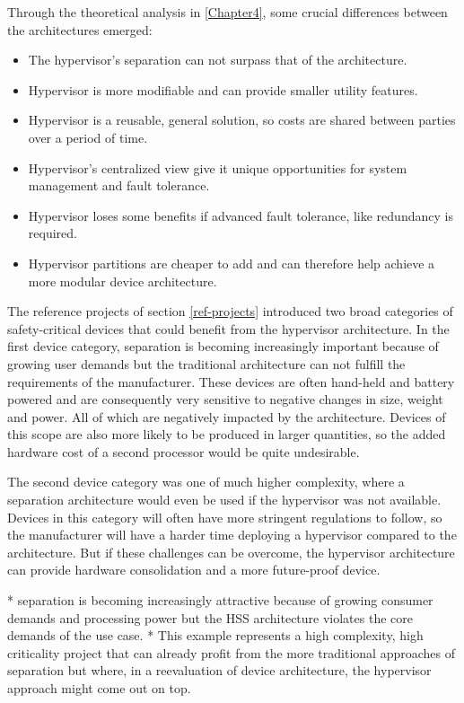 Through the theoretical analysis in \ref{Chapter4}, some crucial differences between the architectures emerged:
\begin{itemize}
    \item The hypervisor's separation can not surpass that of the  architecture.
    \item Hypervisor is more modifiable and can provide smaller utility features.
    \item Hypervisor is a reusable, general solution, so costs are shared between parties over a period of time.
    \item Hypervisor's centralized view give it unique opportunities for system management and fault tolerance.
    \item Hypervisor loses some benefits if advanced fault tolerance, like redundancy is required.
    \item Hypervisor partitions are cheaper to add and can therefore help achieve a more modular device architecture.
\end{itemize}

The reference projects of section \ref{ref-projects} introduced two broad categories of safety-critical devices that could benefit from the hypervisor architecture. In the first device category, separation is becoming increasingly important because of growing user demands but the traditional  architecture can not fulfill the requirements of the manufacturer. These devices are often hand-held and battery powered and are consequently very sensitive to negative changes in size, weight and power. All of which are negatively impacted by the  architecture.
Devices of this scope are also more likely to be produced in larger quantities, so the added hardware cost of a second processor would be quite undesirable.

The second device category was one of much higher complexity, where a separation architecture would even be used if the hypervisor was not available. Devices in this category will often have more stringent regulations to follow, so the manufacturer will have a harder time deploying a hypervisor compared to the  architecture. But if these challenges can be overcome, the hypervisor architecture can provide hardware consolidation and a more future-proof device.

* separation is becoming increasingly attractive because of growing consumer demands and processing power but the HSS architecture violates the core demands of the use case.
* This example represents a high complexity, high criticality project that can already profit from the more traditional approaches of separation but where, in a reevaluation of device architecture, the hypervisor approach might come out on top.

